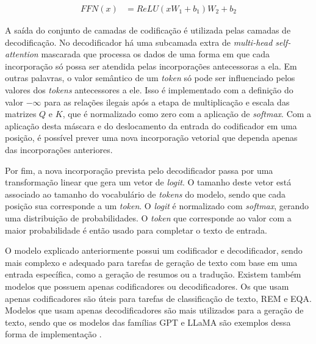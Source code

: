 \begin{align*}
      FFN(x) & = ReLU(xW_1+b_1)W_2 + b_2
\end{align*}

A saída do conjunto de camadas de codificação é utilizada pelas camadas de decodificação. No decodificador há uma subcamada extra de \textit{multi-head self-attention}
mascarada que processa os dados de uma forma em que cada incorporação só possa ser atendida pelas incorporações antecessoras a ela. Em outras palavras, o valor semântico
de um \textit{token} só pode ser influenciado pelos valores dos \textit{tokens} antecessores a ele. Isso é implementado com a definição do valor
\begin{math}-\infty\end{math} para as relações ilegais após a etapa de multiplicação e escala das matrizes \begin{math}Q\end{math} e \begin{math}K\end{math}, que é
normalizado como zero com a aplicação de \textit{softmax}. Com a aplicação desta máscara e do deslocamento da entrada do codificador em uma posição, é possível prever
uma nova incorporação vetorial que dependa apenas das incorporações anteriores.

Por fim, a nova incorporação prevista pelo decodificador passa por uma transformação linear que gera um vetor de \textit{logit}. O tamanho deste vetor está associado ao
tamanho do vocabulário de \textit{tokens} do modelo, sendo que cada posição sua corresponde a um \textit{token}. O \textit{logit} é normalizado com \textit{softmax},
gerando uma distribuição de probabilidades. O \textit{token} que corresponde ao valor com a maior probabilidade é então usado para completar o texto de entrada.


O modelo explicado anteriormente possui um codificador e decodificador, sendo mais complexo e adequado para tarefas de geração de texto com base em uma entrada específica,
como a geração de resumos ou a tradução. Existem também modelos que possuem apenas codificadores ou decodificadores. Os que usam apenas codificadores são úteis para
tarefas de classificação de texto, \ac{REM} e \ac{EQA}. Modelos que usam apenas decodificadores são mais utilizados para a geração de texto, sendo que os modelos das
famílias \ac{GPT} e \ac{LLaMA} são exemplos dessa forma de implementação \cite{llm_survey_2024}.


